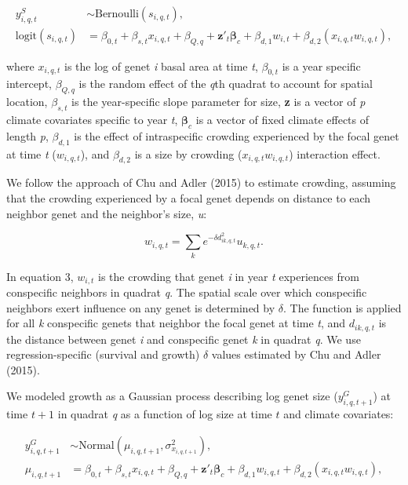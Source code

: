 \documentclass[12pt,]{article}
\begin{document}
\vspace{-3em}\begin{align}
y_{i,q,t}^{S} &\sim \text{Bernoulli}(s_{i,q,t}), \\
\text{logit}(s_{i,q,t}) &= \beta_{0,t} + \beta_{s,t}x_{i,q,t} + \beta_{Q,q} + \textbf{z}'_t \boldsymbol{\beta}_c + \beta_{d,1} w_{i,t} + \beta_{d,2} (x_{i,q,t}w_{i,q,t}),
\end{align}\vspace{-3em}

where \(x_{i,q,t}\) is the log of genet \emph{i} basal area at time
\emph{t}, \(\beta_{0,t}\) is a year specific intercept, \(\beta_{Q,q}\)
is the random effect of the \emph{q}th quadrat to account for spatial
location, \(\beta_{s,t}\) is the year-specific slope parameter for size,
\textbf{z} is a vector of \emph{p} climate covariates specific to year
\emph{t}, \(\boldsymbol{\beta}_c\) is a vector of fixed climate effects
of length \emph{p}, \(\beta_{d,1}\) is the effect of intraspecific
crowding experienced by the focal genet at time \emph{t}
(\(w_{i,q,t}\)), and \(\beta_{d,2}\) is a size by crowding
(\(x_{i,q,t}w_{i,q,t}\)) interaction effect.

We follow the approach of Chu and Adler (2015) to estimate crowding,
assuming that the crowding experienced by a focal genet depends on
distance to each neighbor genet and the neighbor's size, \emph{u}:

\begin{equation}
w_{i,q,t} = \sum_k e^{-\delta d_{ik,q,t}^{2}}u_{k,q,t}.
\end{equation}

In equation 3, \(w_{i,t}\) is the crowding that genet \emph{i} in year
\emph{t} experiences from conspecific neighbors in quadrat \emph{q}. The
spatial scale over which conspecific neighbors exert influence on any
genet is determined by \(\delta\). The function is applied for all
\emph{k} conspecific genets that neighbor the focal genet at time
\emph{t}, and \(d_{ik,q,t}\) is the distance between genet \emph{i} and
conspecific genet \emph{k} in quadrat \emph{q}. We use
regression-specific (survival and growth) \(\delta\) values estimated by
Chu and Adler (2015).

We modeled growth as a Gaussian process describing log genet size
(\(y_{i,q,t+1}^{G}\)) at time \(t+1\) in quadrat \emph{q} as a function
of log size at time \(t\) and climate covariates:

\vspace{-3em}\begin{align}
y_{i,q,t+1}^G &\sim \text{Normal}(\mu_{i,q,t+1}, \sigma^2_{x_{i,q,t+1}}), \\
\mu_{i,q,t+1} &= \beta_{0,t} + \beta_{s,t}x_{i,q,t} + \beta_{Q,q} + \textbf{z}'_t \boldsymbol{\beta}_c + \beta_{d,1} w_{i,q,t} + \beta_{d,2} (x_{i,q,t}w_{i,q,t}),
\end{align}\vspace{-3em}
\end{document}
